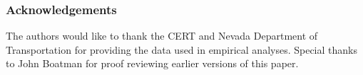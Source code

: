 \documentclass[letterpaper]{article}
\begin{document}
\newpage

\subsubsection*{Acknowledgements}

The authors would like to thank the CERT and Nevada Department of Transportation for providing the data used in empirical analyses. Special thanks to John Boatman for proof reviewing earlier versions of this paper.










\end{document}
